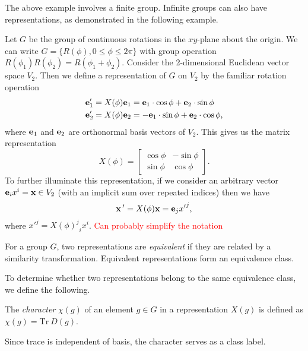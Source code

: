 The above example involves a finite group. Infinite groups can also have representations, as demonstrated in the following example.
\begin{example}
    Let $G$ be the group of continuous rotations in the $xy$-plane about the origin. We can write $G = \{R(\phi),0\leq\phi\leq2\pi\}$ with group operation $R(\phi_1)R(\phi_2) = R(\phi_1+\phi_2)$. Consider the 2-dimensional Euclidean vector space $V_2$. Then we define a representation of $G$ on $V_2$ by the familiar rotation operation
    \begin{align}
        \mathbf{e}_1' &= X(\phi)\mathbf{e}_1 = \mathbf{e}_1\cdot\cos\phi + \mathbf{e}_2\cdot\sin\phi\\
        \mathbf{e}_2' &= X(\phi)\mathbf{e}_2 = -\mathbf{e}_1\cdot\sin\phi + \mathbf{e}_2\cdot\cos\phi,
    \end{align}
    where $\mathbf{e}_1$ and $\mathbf{e}_2$ are orthonormal basis vectors of $V_2$. This gives us the matrix representation
    \begin{equation}
        X(\phi) = \begin{bmatrix}
            \cos\phi & -\sin\phi\\
            \sin\phi & \cos\phi
        \end{bmatrix}.
    \end{equation}
    To further illuminate this representation, if we consider an arbitrary vector $\mathbf{e}_i x^i=\mathbf{x}\in V_2$ (with an implicit sum over repeated indices) then we have
    \begin{equation}
        \mathbf{x}\,' = X(\phi)\mathbf{x} = \mathbf{e}_j{x'}^j,
    \end{equation}
    where ${x'}^j = {{X(\phi)}^j}_i x^i$.
    \textcolor{red}{Can probably simplify the notation}
\end{example}

\begin{definition}
    For a group $G$, two representations are \textit{equivalent} if they are related by a similarity transformation. Equivalent representations form an equivalence class.
\end{definition}

To determine whether two representations belong to the same equivalence class, we define the following.
\begin{definition}
    The \textit{character} $\chi(g)$ of an element $g\in G$ in a representation $X(g)$ is defined as $\chi(g) = \text{Tr}~D(g)$.
\end{definition}
Since trace is independent of basis, the character serves as a class label.


